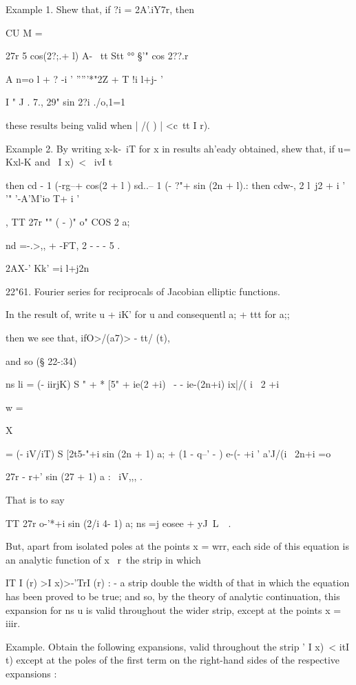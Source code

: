 Example 1. Shew that, if ?i = 2A'.iY7r, then

CU M =

27r 5 cos(2?;.+ l) A- \ tt Stt °° §'" cos 2??.r

A n=o l + ? -i ' '''''*"2Z + T !i l+j- '

I " J . 7., 29" sin 2?i ./o,1=1 %

these results being valid when | /( ) | <c\ tt I r).

Example 2. By writing x-k-\ iT for x in results ah'eady obtained, shew
that, if u= Kxl-K and \ I x)\ < \ ivI t\

then cd - 1 (-rg--+ cos(2 + l ) sd..-- 1 (- ?"+ sin (2n + l).: then
cdw-, 2 l\ j2 + i ' '" '-A'M'io T+ i '

, TT 27r "" ( - )" o" COS 2 a;

nd =-.>,, + -FT, 2 - - - 5 .

2AX-' Kk' =i l+j2n

22"61. Fourier series for reciprocals of Jacobian elliptic functions.

In the result of, write u + iK' for u and consequentl a; + ttt
for a;;

then we see that, ifO>/(a7)> - tt/ (t),

and so (§ 22-:34)

ns li = (- iirjK) S " + * [5" + ie(2 +i) \ - - ie-(2n+i) ix|/( i \ 2
+i

w =

X

= (- iV/iT) S [2t5-"+i sin (2n + 1) a; + (1 - q--' - ) e-(- +i '
a'J/(i \ 2n+i =o

  27r - r+' sin (27 + 1) a : \ iV,,, .

That is to say

TT 27r o-'*+i sin (2/i 4- 1) a; ns =j eosee + yJ\ L\ \ .

But, apart from isolated poles at the points x = wrr, each side of
this equation is an analytic function of x \ r\ the strip in which

IT I (r) >I x)>-'TrI (r) : - a strip double the width of that in which
the equation has been proved to be true; and so, by the theory of
analytic continuation, this expansion for ns u is valid throughout the
wider strip, except at the points x = iiir.

%
%

Example. Obtain the following expansions, valid throughout the strip '
I x)\ < itI t) except at the poles of the first term on the right-hand
sides of the respective expansions :

